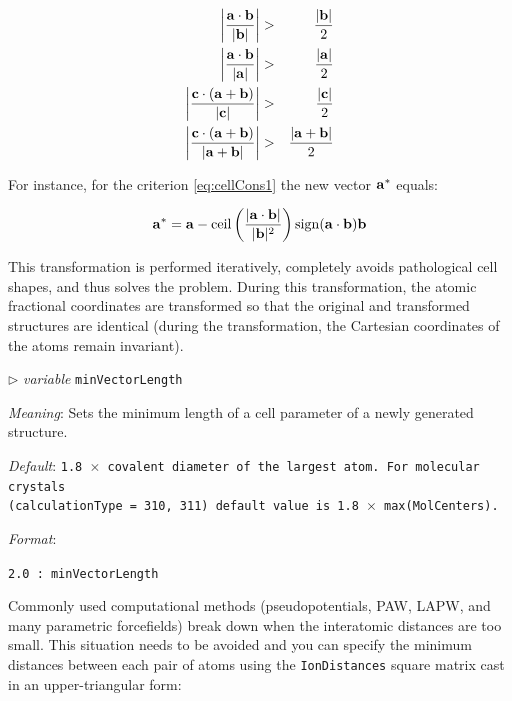 \documentclass[12pt]{article}
\newcommand{\keyword}[1]{\texttt{#1}}
\newcommand{\paramacro}[6]{
\vspace{0.5cm}
$\triangleright$ \emph{variable} {\color{blue} \texttt{#1}}

\emph{Meaning}: {#2}

{#3}

\emph{Default}: \texttt{#4}

\emph{Format}:

{\addtolength{\leftskip}{10mm} 
\texttt{#5}
\par}


{\small #6}

}
\begin{document}
\begin{eqnarray}\label{eq:cellCons}
\left|\frac{\bf a \cdot b}{\bf \vert b \vert}\right| &>& \frac{\bf |b|}{2} \label{eq:cellCons1}\\
\left|\frac{\bf a \cdot b}{\bf \vert a \vert}\right| &>& \frac{\bf |a|}{2} \label{eq:cellCons2}\\
\left|\frac{\bf c \cdot (a + b)}{\bf \vert c \vert}\right| &>& \frac{\bf |c|}{2} \label{eq:cellCons3}\\
\left|\frac{\bf c \cdot (a + b)}{\bf \vert a+b \vert}\right| &>& \frac{\bf |a+b|}{2} \label{eq:cellCons4}
\end{eqnarray}

For instance, for the criterion \ref{eq:cellCons1} the new vector $\bf a^*$
equals:

\begin{equation}
{\bf a}^* = {\bf a} - {\rm ceil} \left( \frac{\vert {\bf a} \cdot {\bf b}
\vert}{\vert {\bf b} \vert ^2} \right){\rm sign}({\bf a}\cdot {\bf b}){\bf b}
\end{equation}

This transformation is performed iteratively, completely avoids pathological
cell shapes, and thus solves the problem. During this transformation, the atomic
fractional coordinates are transformed so that the original and transformed
structures are identical (during the transformation, the Cartesian coordinates
of the atoms remain invariant).


\paramacro{minVectorLength}{Sets the minimum length of a cell parameter of a
newly generated structure.}{}{\rm 1.8 $\times$ covalent diameter of the largest
atom. For molecular crystals \\(\keyword{calculationType} = 310, 311) default
value is 1.8 $\times$ max(\keyword{MolCenters}).}{2.0 : minVectorLength}{}

\vspace{0.5cm}

Commonly used computational methods (pseudopotentials, PAW, LAPW, and many
parametric forcefields) break down when the interatomic distances are too small.
This situation needs to be avoided and you can specify the minimum distances
between each pair of atoms using the \keyword{IonDistances} square matrix cast
in an upper-triangular form:
\end{document}
